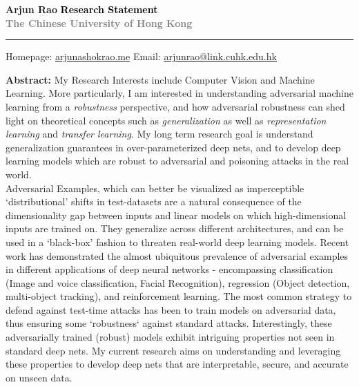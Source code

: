\documentclass[11pt]{article}
\newcommand{\HRule}[1][\medskipamount]{\par
  \vspace*{\dimexpr-\parskip-\baselineskip+#1}
  \noindent\rule{\linewidth}{0.3mm}\par
  \vspace*{\dimexpr-\parskip-.3\baselineskip+#1}}
\begin{document}
\thispagestyle{empty}
\Large \textbf{Arjun Rao} \hfill \Large  \textbf{\textcolor{black}{\Large{Research Statement} }} \\ \textcolor{gray}{\textbf{\hspace*{0.25in}\normalsize{The Chinese University of Hong Kong}}}
\HRule

\small Homepage: \href{https://arjunashokrao.me}{arjunashokrao.me} \quad Email: \href{mailto:arjunrao@link.cuhk.edu.hk}{arjunrao@link.cuhk.edu.hk}

\bigskip

\textbf{Abstract:} My Research Interests include Computer Vision and Machine Learning. More particularly, I am interested in understanding adversarial machine learning from a \emph{robustness} perspective, and how adversarial robustness can shed light on theoretical concepts such as \emph{generalization} as well as \emph{representation learning} and \emph{transfer learning}. My long term research goal is understand generalization guarantees in over-parameterized deep nets, and to develop deep learning models which are robust to adversarial and poisoning attacks in the real world.  \\

Adversarial Examples, which can better be visualized as imperceptible `distributional' shifts in test-datasets are a natural consequence of the dimensionality gap between inputs and linear models on which high-dimensional inputs are trained on.
They generalize across different architectures, and can be used in a `black-box' fashion to threaten real-world deep learning models. Recent work has demonstrated the almost ubiquitous prevalence of adversarial examples in different applications of deep neural networks - encompassing classification (Image and voice classification, Facial Recognition), regression (Object detection, multi-object tracking), and reinforcement learning. The most common strategy to defend against test-time attacks has been to train models on adversarial data, thus ensuring some `robustness` against standard attacks. Interestingly, these adversarially trained (robust) models exhibit intriguing properties not seen in standard deep nets. My current research aims on understanding and leveraging these properties to develop deep nets that are interpretable, secure, and accurate on unseen data. 
    \\
\end{document}
